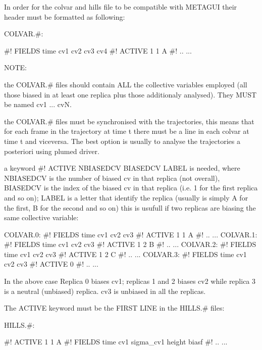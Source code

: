 In order for the colvar and hills file to be compatible with M\+E\+T\+A\+G\+U\+I their header must be formatted as following\+:

C\+O\+L\+V\+A\+R.\#\+: \begin{DoxyVerb}#! FIELDS time cv1 cv2 cv3 cv4
#! ACTIVE 1 1 A
#! ..
...
\end{DoxyVerb}


N\+O\+T\+E\+:
\begin{DoxyEnumerate}
\item the C\+O\+L\+V\+A\+R.\# files should contain A\+L\+L the collective variables employed (all those biased in at least one replica plus those additionaly analysed). They M\+U\+S\+T be named cv1 ... cv\+N.
\item the C\+O\+L\+V\+A\+R.\# files must be synchronised with the trajectories, this means that for each frame in the trajectory at time t there must be a line in each colvar at time t and viceversa. The best option is usually to analyse the trajectories a posteriori using plumed driver.
\item a keyword \#! A\+C\+T\+I\+V\+E N\+B\+I\+A\+S\+E\+D\+C\+V B\+I\+A\+S\+E\+D\+C\+V L\+A\+B\+E\+L is needed, where N\+B\+I\+A\+S\+E\+D\+C\+V is the number of biased cv in that replica (not overall), B\+I\+A\+S\+E\+D\+C\+V is the index of the biased cv in that replica (i.\+e. 1 for the first replica and so on); L\+A\+B\+E\+L is a letter that identify the replica (usually is simply A for the first, B for the second and so on) this is usufull if two replicas are biasing the same collective variable\+:
\end{DoxyEnumerate}

\begin{DoxyVerb}COLVAR.0:
#! FIELDS time cv1 cv2 cv3
#! ACTIVE 1 1 A
#! ..
...
COLVAR.1:
#! FIELDS time cv1 cv2 cv3
#! ACTIVE 1 2 B
#! ..
...
COLVAR.2:
#! FIELDS time cv1 cv2 cv3
#! ACTIVE 1 2 C
#! ..
...
COLVAR.3:
#! FIELDS time cv1 cv2 cv3
#! ACTIVE 0 
#! ..
...\end{DoxyVerb}


In the above case Replica 0 biases cv1; replicas 1 and 2 biases cv2 while replica 3 is a neutral (unbiased) replica. cv3 is unbiased in all the replicas.

The A\+C\+T\+I\+V\+E keyword must be the F\+I\+R\+S\+T L\+I\+N\+E in the H\+I\+L\+L\+S.\# files\+:

H\+I\+L\+L\+S.\#\+: \begin{DoxyVerb}#! ACTIVE 1 1 A
#! FIELDS time cv1 sigma_cv1 height biasf
#! ..
...
\end{DoxyVerb}


